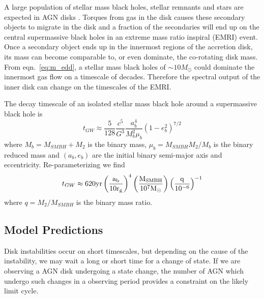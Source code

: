 \documentclass{mnras}
\begin{document}
A large population of stellar mass black holes, stellar remnants and stars are expected in AGN disks \citep[e.g.][]{Syer91,Arty93,McK12}. Torques from gas in the disk causes these secondary objects to migrate in the disk and a fraction of the secondaries will end up on the central supermassive black holes in an extreme mass ratio inspiral (EMRI) event. Once a secondary object ends up in the innermost regions of the accretion disk, its mass can become comparable to, or even dominate, the co-rotating disk mass. From eqn.~\ref{eq:m_edd}, a stellar mass black holes of $\sim 10M_{\odot}$ could dominate the innermost gas flow on a timescale of decades. Therefore the spectral output of the inner disk can change on the timescales of the EMRI.

The decay timescale of an isolated stellar mass black hole around a supermassive black hole is \citep{Peters64}  
\begin{equation}
t_{GW} \approx \frac{5}{128} \frac{c^{5}}{G^{3}} \frac{a_{b}^{4}}{M_{b}^{2} \mu_{b}} (1-e_{b}^{2})^{7/2}
\label{eq:t_gw}
\end{equation}
where $M_{b}=M_{SMBH}+M_{2}$ is the binary mass, $\mu_{b}=M_{SMBH}M_{2}/M_{b}$ is the binary reduced mass and $(a_{b},e_{b})$ are the initial binary semi-major axis and eccentricity. Re-parameterizing we find
\begin{equation}
t_{GW} \approx 620\rm{yr} \left( \frac{a_{b}}{10r_{g}}\right)^{4} \left( \frac{M_{SMBH}}{10^{7}M_{\odot}}\right) \left(\frac{q}{10^{-6}} \right)^{-1}
\end{equation}
where $q=M_{2}/M_{SMBH}$ is the binary mass ratio.

\subsection{Model Predictions}
Disk instabilities occur on short timescales, but depending on the cause of the instability, we may wait a long or short time for a change of state.
If we are observing a AGN disk undergoing a state change, the number of AGN which undergo such changes in a observing period provides a constraint on the likely limit cycle.
\end{document}
